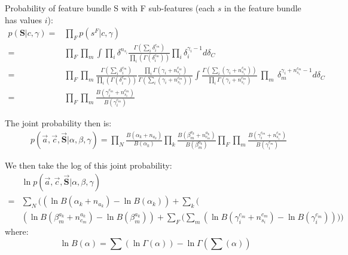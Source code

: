 \documentclass[../main.tex]{subfiles}
\begin{document}
Probability of feature bundle S with F sub-features (each $s$ in the feature bundle has values $i$):
\begin{equation}
\begin{split}
p(\mathbf{S}| c, \gamma) =& 
\prod_{F} p(s^{F}|c, \gamma)\\
=& \prod_{F} \prod_{m} \int 
\prod_{i} \delta^{n_{s_{i}}}
\frac{\Gamma(\sum_{i}\delta_{i}^{c_{m}})}{\prod_{i}(\Gamma(\delta_{i}^{c_{m}}))}
\prod_{i} \delta^{\gamma_{i}-1}_{i}
d\delta_{C}\\
=& \prod_{F} \prod_{m}
\frac{\Gamma(\sum_{i}\delta_{i}^{c_{m}})}{\prod_{i}(\Gamma(\delta_{i}^{c_{m}}))} %
\frac{\prod_{i}\Gamma(\gamma_{i}+n^{c_{m}}_{s_{i}})}{\Gamma(\sum_{i}(\gamma_{i}+n^{c_{m}}_{s_{i}}))}%
 \int 
\frac{\Gamma(\sum_{i}(\gamma_{i}+n^{c_{m}}_{s_{i}}))}{\prod_{i}\Gamma(\gamma_{i}+n^{c_{m}}_{s_{i}})}\ \prod_{m}\ \delta_{m}^{\gamma_{i}+n^{c_{m}}_{s_{i}}-1} 
d\delta_{C}\\
=&\prod_{F} \prod_{m} \frac{B(\gamma_{i}^{c_{m}}+n^{c_{m}}_{s_{i}})}{B(\gamma_{i}^{c_{m}})}
\end{split}
\end{equation}

The joint probability then is:
\begin{equation}
\begin{split}
&p(\vec{a}, \vec{c}, \vec{\mathbf{S}}|\alpha, \beta,\gamma) = \prod_{N} \frac{B(\alpha_{k}+n_{a_{k}})}{B(\alpha_{k})} %
\prod_{k} \frac{B(\beta_{m}^{a_{k}}+n_{c_{m}}^{a_{k}})}{B(\beta_{m}^{a_{k}})} %
\prod_{F} \prod_{m} \frac{B(\gamma_{i}^{c_{m}}+n^{c_{m}}_{s_{i}})}{B(\gamma_{i}^{c_{m}})} %
\end{split}
\end{equation}

We then take the log of this joint probability:
\begin{equation}
\begin{split}
&\ln p(\vec{a}, \vec{c}, \vec{\mathbf{S}}|\alpha, \beta,\gamma) \\
=&\sum_{N} \bigg(
(\ln B (\alpha_{k}+n_{a_{k}})-\ln B(\alpha_{k})) +\sum_{k} \big(\\
&(\ln B (\beta^{a_{k}}_{m}+n^{a_{k}}_{c_{m}})-\ln B(\beta^{a_{k}}_{m}))+ %
\sum_{F}(
\sum_{m}( \ln B(\gamma^{c_{m}}_{i}+n^{c_{m}}_{s_{i}}) -\ln B(\gamma^{c_{m}}_{i})
)
\big)
\bigg)
\end{split}
\end{equation}
where:
\begin{equation} \ln B(\alpha) = \sum(\ln \Gamma(\alpha)) - \ln \Gamma(\sum(\alpha))
\end{equation}
\end{document}
